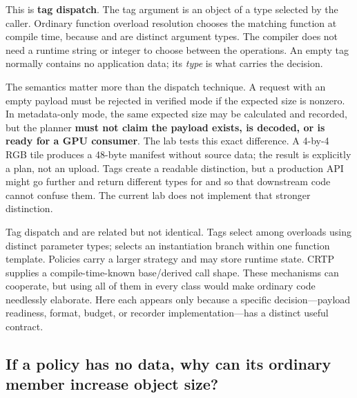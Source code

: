 This is \textbf{tag dispatch}. The tag argument is an object of a type selected by the caller. Ordinary function overload resolution chooses the matching function at compile time, because  and  are distinct argument types. The compiler does not need a runtime string or integer to choose between the operations. An empty tag normally contains no application data; its \emph{type} is what carries the decision.

The semantics matter more than the dispatch technique. A request with an empty payload must be rejected in verified mode if the expected size is nonzero. In metadata-only mode, the same expected size may be calculated and recorded, but the planner \textbf{must not claim the payload exists, is decoded, or is ready for a GPU consumer}. The lab tests this exact difference. A 4-by-4 RGB tile produces a 48-byte manifest without source data; the result is explicitly a plan, not an upload. Tags create a readable distinction, but a production API might go further and return different types for  and  so that downstream code cannot confuse them. The current lab does not implement that stronger distinction.

Tag dispatch and  are related but not identical. Tags select among overloads using distinct parameter types;  selects an instantiation branch within one function template. Policies carry a larger strategy and may store runtime state. CRTP supplies a compile-time-known base/derived call shape. These mechanisms can cooperate, but using all of them in every class would make ordinary code needlessly elaborate. Here each appears only because a specific decision---payload readiness, format, budget, or recorder implementation---has a distinct useful contract.

\subsection{If a policy has no data, why can its ordinary member increase object size?}\label{01-foundations-i-ch005-if-a-policy-has-no-data-why-can-its-ordinary-member-increase-object-size}

